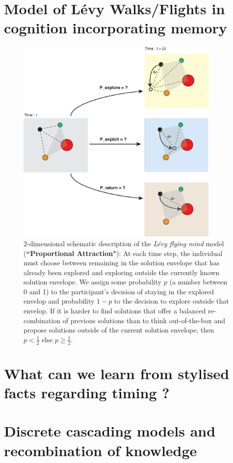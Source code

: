 \section{Model of L\'evy Walks/Flights in cognition incorporating memory}


\begin{figure}[h!]
\begin{center}
\includegraphics[width=10cm]{figures/schematic_displacement.eps}
\caption{\footnotesize{2-dimensional schematic description of the {\it L\'evy flying mind} model ({\bf ``Proportional Attraction"}): At each time step, the individual must choose between remaining in the solution envelope that has already been explored and exploring outside the currently known solution envelope.  We assign some probability $p$ (a number between 0 and 1) to the participant's decision of staying in the explored envelop and probability $1-p$ to the decision to explore outside that envelop.  If it is harder to find solutions that offer a balanced re-combination of previous solutions than to think out-of-the-box and propose solutions outside of the current solution envelope, then $p < \frac{1}{2}$ else $p \geq \frac{1}{2}$.}}
\label{fig:schematic}
\end{center}
\end{figure}

\section{What can we learn from stylised facts regarding timing ?}

\section{Discrete cascading models and recombination of knowledge}



